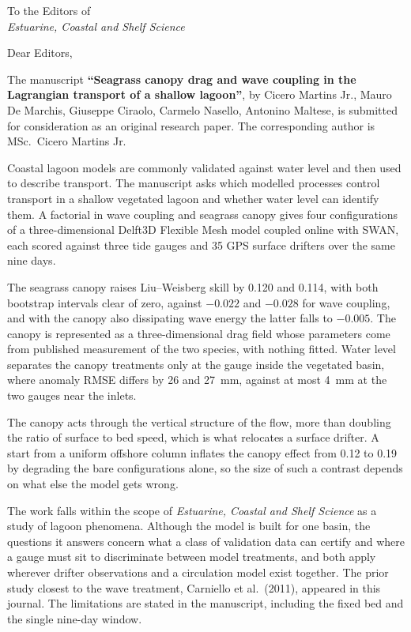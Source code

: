 \documentclass[11pt]{article}
\begin{document}
\thispagestyle{fancy}

\vspace{0.3cm}
\begin{flushright}
To the Editors of\\
\textit{Estuarine, Coastal and Shelf Science}
\end{flushright}

\vspace{0.5cm}
Dear Editors,

\vspace{0.2cm}
The manuscript \textbf{``Seagrass canopy drag and wave coupling in the Lagrangian transport of a shallow lagoon''}, by Cicero Martins Jr., Mauro De Marchis, Giuseppe Ciraolo, Carmelo Nasello, Antonino Maltese, is
submitted for consideration as an original research paper. The corresponding
author is MSc.\ Cicero Martins Jr.

\vspace{0.3cm}
Coastal lagoon models are commonly validated against water level and then used
to describe transport. The manuscript asks which modelled processes control
transport in a shallow vegetated lagoon and whether water level can identify
them. A factorial in wave coupling and seagrass canopy gives four
configurations of a three-dimensional Delft3D Flexible Mesh model coupled
online with SWAN, each scored against three tide gauges and 35 GPS surface
drifters over the same nine days.

The seagrass canopy raises Liu--Weisberg skill by 0.120 and
0.114, with both bootstrap intervals clear of zero, against $-0.022$ and
$-0.028$ for wave coupling, and with the canopy also dissipating wave energy the
latter falls to $-0.005$. The canopy is represented as a three-dimensional
drag field whose parameters come from published measurement of the two species,
with nothing fitted. Water level separates the canopy treatments only at the
gauge inside the vegetated basin, where anomaly RMSE differs by 26 and 27~mm,
against at most 4~mm at the two gauges near the inlets.

The canopy acts through the vertical structure of the flow, more than doubling
the ratio of surface to bed speed, which is what relocates a surface drifter. A
start from a uniform offshore column inflates the canopy effect from 0.12 to
0.19 by degrading the bare configurations alone, so the size of such a
contrast depends on what else the model gets wrong.

The work falls within the scope of \textit{Estuarine, Coastal and Shelf
Science} as a study of lagoon phenomena. Although the model is built for one
basin, the questions it answers concern what a class of validation data can
certify and where a gauge must sit to discriminate between model treatments,
and both apply wherever drifter observations and a circulation model exist
together. The prior study closest to the wave treatment, Carniello et al.\
(2011), appeared in this journal. The limitations are stated in the
manuscript, including the fixed bed and the single nine-day window.
\end{document}
